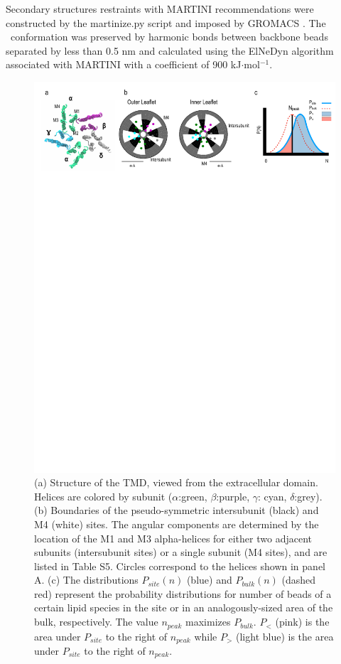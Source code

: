 Secondary structures restraints with MARTINI recommendations were constructed by the martinize.py \cite{DeJong2012} script and imposed by GROMACS \cite{Berendsen1995,Abraham2015}. The \nachr~conformation was preserved by harmonic bonds between backbone beads separated by less than 0.5 nm and calculated using the ElNeDyn algorithm \cite{Periole2009} associated with MARTINI \cite{DeJong2012} with a coefficient of 900 kJ$\cdot$mol$^{-1}$.
\begin{figure}[!h]
	\center
	\includegraphics[width=\linewidth]{./Figures/PartialBIndingToy.pdf}
	\caption[ Binding site boundaries and distribution definitions.] { (a) Structure of the \nachr {}TMD\cite{Unwin2005}, viewed from the extracellular domain. Helices are colored by subunit ($\alpha$:green, $\beta$:purple, $\gamma$: cyan, $\delta$:grey). (b) Boundaries of the pseudo-symmetric intersubunit (black) and M4 (white) sites. The angular components are determined by the location of the M1 and M3 alpha-helices for either two adjacent subunits (intersubunit sites) or a single subunit (M4 sites), and are listed in Table S5. Circles correspond to the helices shown in panel A.  (c)  The distributions $P_{site} (n)$ (blue) and $P_{bulk}(n)$ (dashed red) represent the probability distributions for number of beads of a certain lipid species in the site or in an analogously-sized area of the bulk, respectively. The value $n_{peak}$ maximizes $P_{bulk}$. $P_<$ (pink) is the area under $P_{site}$ to the right of $n_{peak}$ while $P_>$ (light blue) is the area under $P_{site}$ to the right of $n_{peak}$. }
	\label{fig:PBT}
\end{figure}

